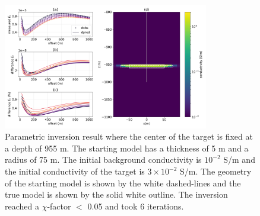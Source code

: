 \begin{figure}
    \begin{center}
    \includegraphics[width=0.8\textwidth]{figures/inversion/parametric_voxel2_large_r.png}
    \end{center}
\caption{
    Parametric inversion result where the center of the target is fixed at a depth
    of 955 m. The starting model has a thickness of 5 m and a radius of 75 m. The initial background
    conductivity is $10^{-2}$ S/m and the initial conductivity of the target is $3\times10^{-2}$ S/m.
    The geometry of the starting model is shown by the white dashed-lines and the
    true model is shown by the solid white outline. The inversion reached a $\chi$-factor $<$ 0.05
    and took 6 iterations.
}
\label{fig:parametric_voxel2_large_r}
\end{figure}
